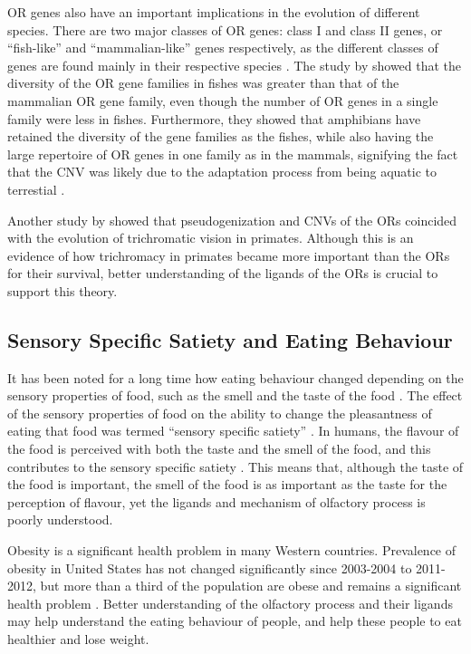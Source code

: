 \documentclass[a4paper, 12pt]{article}
\begin{document}
OR genes also have an important implications in the evolution of different species.
There are two major classes of OR genes: class I and class II genes, or ``fish-like'' and ``mammalian-like'' genes respectively, as the different classes of genes are found mainly in their respective species \citep{Glusman2000}.
The study by \citet{Niimura2005} showed that the diversity of the OR gene families in fishes was greater than that of the mammalian OR gene family, even though the number of OR genes in a single family were less in fishes.
Furthermore, they showed that amphibians have retained the diversity of the gene families as the fishes, while also having the large repertoire of OR genes in one family as in the mammals, signifying the fact that the CNV was likely due to the adaptation process from being aquatic to terrestial \citep{Niimura2005}.

Another study by \citet{Liman2003} showed that pseudogenization and CNVs of the ORs coincided with the evolution of trichromatic vision in primates.
Although this is an evidence of how trichromacy in primates became more important than the ORs for their survival, better understanding of the ligands of the ORs is crucial to support this theory.

\subsection*{Sensory Specific Satiety and Eating Behaviour}

It has been noted for a long time how eating behaviour changed depending on the sensory properties of food, such as the smell and the taste of the food \citep{Rolls1981, Rolls1982}.
The effect of the sensory properties of food on the ability to change the pleasantness of eating that food was termed ``sensory specific satiety'' \citep{Rolls1981}.
In humans, the flavour of the food is perceived with both the taste and the smell of the food, and this contributes to the sensory specific satiety \citep{Rolls2005}.
This means that, although the taste of the food is important, the smell of the food is as important as the taste for the perception of flavour, yet the ligands and mechanism of olfactory process is poorly understood.

Obesity is a significant health problem in many Western countries.
Prevalence of obesity in United States has not changed significantly since 2003-2004 to 2011-2012, but more than a third of the population are obese and remains a significant health problem \citep{Ogden2014}.
Better understanding of the olfactory process and their ligands may help understand the eating behaviour of people, and help these people to eat healthier and lose weight.
\end{document}
